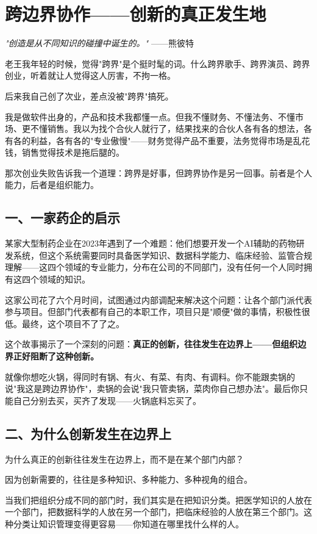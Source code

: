 \chapter{跨边界协作——创新的真正发生地}


\textit{"创造是从不同知识的碰撞中诞生的。"}
——熊彼特


老王我年轻的时候，觉得"跨界"是个挺时髦的词。什么跨界歌手、跨界演员、跨界创业，听着就让人觉得这人厉害，不拘一格。

后来我自己创了次业，差点没被"跨界"搞死。

我是做软件出身的，产品和技术我都懂一点。但我不懂财务、不懂法务、不懂市场、更不懂销售。我以为找个合伙人就行了，结果找来的合伙人各有各的想法，各有各的利益，各有各的"专业傲慢"——财务觉得产品不重要，法务觉得市场是乱花钱，销售觉得技术是拖后腿的。

那次创业失败告诉我一个道理：跨界是好事，但跨界协作是另一回事。前者是个人能力，后者是组织能力。

\section{一、一家药企的启示}


某家大型制药企业在2023年遇到了一个难题：他们想要开发一个AI辅助的药物研发系统，但这个系统需要同时具备医学知识、数据科学能力、临床经验、监管合规理解——这四个领域的专业能力，分布在公司的不同部门，没有任何一个人同时拥有这四个领域的知识。

这家公司花了六个月时间，试图通过内部调配来解决这个问题：让各个部门派代表参与项目。但部门代表都有自己的本职工作，项目只是"顺便"做的事情，积极性很低。最终，这个项目不了了之。

这个故事揭示了一个深刻的问题：\textbf{真正的创新，往往发生在边界上——但组织边界正好阻断了这种创新。}

就像你想吃火锅，得同时有锅、有火、有菜、有肉、有调料。你不能跟卖锅的说"我这是跨边界协作"，卖锅的会说"我只管卖锅，菜肉你自己想办法"。最后你只能自己分别去买，买齐了发现——火锅底料忘买了。

\section{二、为什么创新发生在边界上}


为什么真正的创新往往发生在边界上，而不是在某个部门内部？

因为创新需要的，往往是多种知识、多种能力、多种视角的组合。

当我们把组织分成不同的部门时，我们其实是在把知识分类。把医学知识的人放在一个部门，把数据科学的人放在另一个部门，把临床经验的人放在第三个部门。这种分类让知识管理变得更容易——你知道在哪里找什么样的人。

